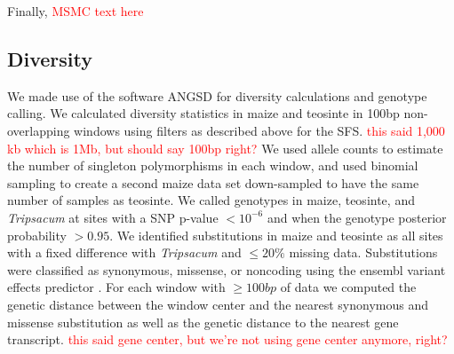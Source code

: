 \documentclass{pnastwo}
\newcommand{\jri}[1]{\textcolor{red}{\scriptsize #1}}
\begin{document}
\begin{article}
\begin{materials}
Finally, \jri{MSMC text here}

\subsection{Diversity}
We made use of the software ANGSD \cite{korneliussen2014} for diversity calculations and genotype calling. 
We calculated diversity statistics in maize and teosinte in 100bp non-overlapping windows using filters as described above for the SFS. \jri{this said 1,000 kb which is 1Mb, but should say 100bp right?}
We used allele counts to estimate the number of singleton polymorphisms in each window, and used binomial sampling to create a second maize data set down-sampled to have the same number of samples as teosinte.
We called genotypes in maize, teosinte, and \emph{Tripsacum} at sites with a SNP p-value $<10^{-6}$ and when the genotype posterior probability $>0.95$.
We identified substitutions in maize and teosinte as all sites with a fixed difference with \emph{Tripsacum} and $\leq 20\%$ missing data. 
Substitutions were classified as synonymous, missense, or noncoding using the ensembl variant effects predictor \cite{mclaren2010}.
For each window with $\geq 100bp$ of data we computed the genetic distance between the window center and the nearest synonymous and missense substitution as well as the genetic distance to the nearest gene transcript. \jri{this said gene center, but we're not using gene center anymore, right?} 



\end{materials}
\end{article}
\end{document}
